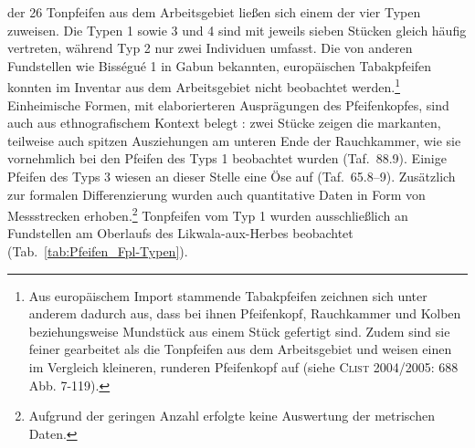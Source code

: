  der 26 Tonpfeifen aus dem Arbeitsgebiet ließen sich einem der vier Typen zuweisen. Die Typen 1 sowie 3 und 4 sind mit jeweils sieben Stücken gleich häufig vertreten, während Typ 2 nur zwei Individuen umfasst. Die von anderen Fundstellen wie Bisségué 1 in Gabun \parencite[688 Abb. 7-119]{Clist.20042005} bekannten, europäischen Tabakpfeifen konnten im Inventar aus dem Arbeitsgebiet nicht beobachtet werden.\footnote{Aus europäischem Import stammende Tabakpfeifen zeichnen sich unter anderem dadurch aus, dass bei ihnen Pfeifenkopf, Rauchkammer und Kolben beziehungsweise Mundstück aus einem Stück gefertigt sind. Zudem sind sie feiner gearbeitet als die Tonpfeifen aus dem Arbeitsgebiet und weisen einen im Vergleich kleineren, runderen Pfeifenkopf auf (siehe \textsc{Clist} 2004/2005: 688 Abb. 7-119).} Einheimische Formen, mit elaborierteren Ausprägungen des Pfeifenkopfes, sind auch aus ethnografischem Kontext belegt \parencite[18]{Coart.1907}: zwei Stücke zeigen die markanten, teilweise auch spitzen Ausziehungen am unteren Ende der Rauchkammer, wie sie vornehmlich bei den Pfeifen des Typs 1 beobachtet wurden (Taf.~88.9). Einige Pfeifen des Typs 3 wiesen an dieser Stelle eine Öse auf (Taf.~65.8--9). Zusätzlich zur formalen Differenzierung wurden auch quantitative Daten in Form von Messstrecken erhoben.\footnote{Aufgrund der geringen Anzahl erfolgte keine Auswertung der metrischen Daten.} Tonpfeifen vom Typ 1 wurden ausschließlich an Fundstellen am Oberlaufs des \mbox{Likwala}-\mbox{aux}-\mbox{Herbes} beobachtet (Tab.~\ref{tab:Pfeifen_Fpl-Typen}).